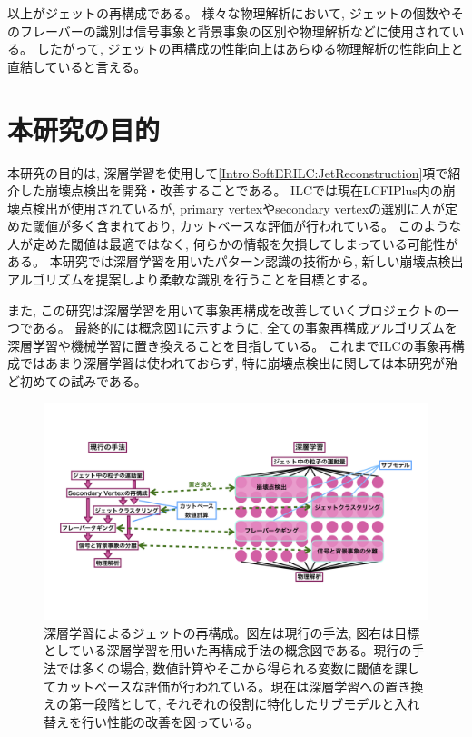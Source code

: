 以上がジェットの再構成である。
様々な物理解析において, ジェットの個数やそのフレーバーの識別は信号事象と背景事象の区別や物理解析などに使用されている。
したがって, ジェットの再構成の性能向上はあらゆる物理解析の性能向上と直結していると言える。


\section{本研究の目的} \label{Intro:Purpose}

本研究の目的は, 深層学習を使用して\ref{Intro:SoftERILC:JetReconstruction}項で紹介した崩壊点検出を開発・改善することである。
ILCでは現在LCFIPlus内の崩壊点検出が使用されているが, primary vertexやsecondary vertexの選別に人が定めた閾値が多く含まれており, カットベースな評価が行われている。
このような人が定めた閾値は最適ではなく, 何らかの情報を欠損してしまっている可能性がある。
本研究では深層学習を用いたパターン認識の技術から, 新しい崩壊点検出アルゴリズムを提案しより柔軟な識別を行うことを目標とする。

また, この研究は深層学習を用いて事象再構成を改善していくプロジェクトの一つである。
最終的には概念図\ref{7JetReconstructionwithDeepLearning}に示すように, 全ての事象再構成アルゴリズムを深層学習や機械学習に置き換えることを目指している。
これまでILCの事象再構成ではあまり深層学習は使われておらず, 特に崩壊点検出に関しては本研究が殆ど初めての試みである。

\begin{figure}[htbp]
 \centering
 \includegraphics[trim = 0 100 0 50, width=1.0\textwidth, clip]{Figure/1Introduction/7JetReconstructionwithDeepLearning.png}
 \caption[深層学習によるジェットの再構成]{深層学習によるジェットの再構成。図左は現行の手法, 図右は目標としている深層学習を用いた再構成手法の概念図である。現行の手法では多くの場合, 数値計算やそこから得られる変数に閾値を課してカットベースな評価が行われている。現在は深層学習への置き換えの第一段階として, それぞれの役割に特化したサブモデルと入れ替えを行い性能の改善を図っている。}
 \label{7JetReconstructionwithDeepLearning}
\end{figure}

